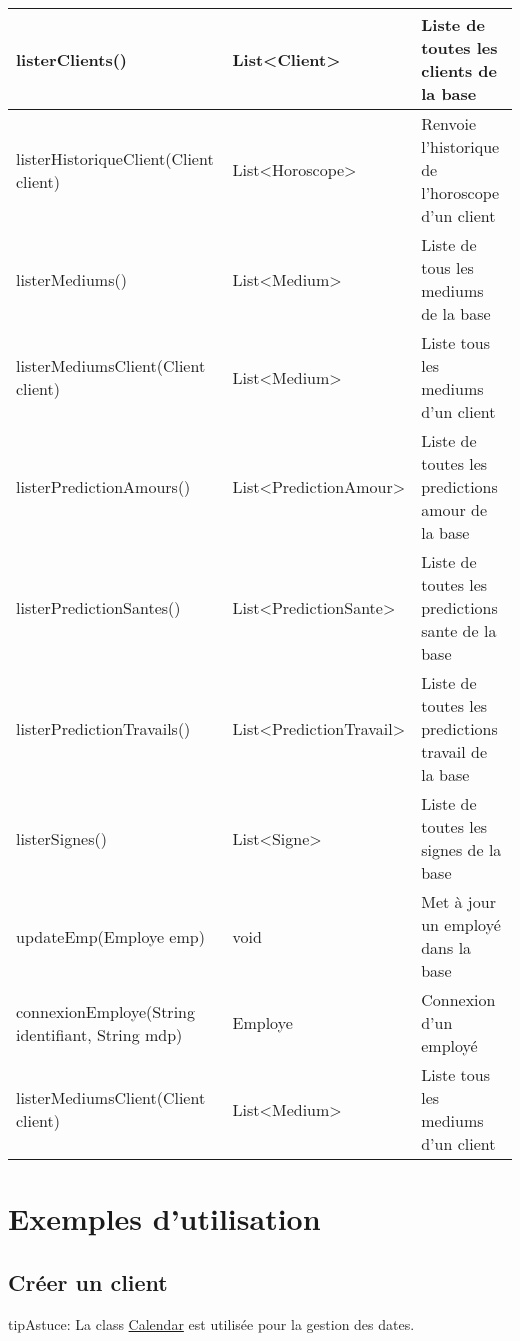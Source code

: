 \documentclass[a4paper,10pt,french]{sphinxmanual}
\begin{document}
\begin{tabulary}{\linewidth}{|p{6cm}|p{4cm}|p{5cm}|}
\hline
listerClients()
 & 
List\textless{}Client\textgreater{}
 & 
Liste de toutes les clients de la base
\\
\hline
listerHistoriqueClient(Client client)
 & 
List\textless{}Horoscope\textgreater{}
 & 
Renvoie l'historique de l'horoscope d'un client
\\
\hline
listerMediums()
 & 
List\textless{}Medium\textgreater{}
 & 
Liste de tous les mediums de la base
\\
\hline
listerMediumsClient(Client client)
 & 
List\textless{}Medium\textgreater{}
 & 
Liste tous les mediums d'un client
\\
\hline
listerPredictionAmours()
 & 
List\textless{}PredictionAmour\textgreater{}
 & 
Liste de toutes les predictions amour de la base
\\
\hline
listerPredictionSantes()
 & 
List\textless{}PredictionSante\textgreater{}
 & 
Liste de toutes les predictions sante de la base
\\
\hline
listerPredictionTravails()
 & 
List\textless{}PredictionTravail\textgreater{}
 & 
Liste de toutes les predictions travail de la base
\\
\hline
listerSignes()
 & 
List\textless{}Signe\textgreater{}
 & 
Liste de toutes les signes de la base
\\
\hline
updateEmp(Employe emp)
 & 
void
 & 
Met à jour un employé dans la base
\\
\hline
connexionEmploye(String identifiant, String mdp)
 & 
Employe
 & 
Connexion d'un employé
\\
\hline
listerMediumsClient(Client client)
 & 
List\textless{}Medium\textgreater{}
 & 
Liste tous les mediums d'un client
\\
\hline\end{tabulary}



\section{Exemples d'utilisation}
\label{services:exemples-d-utilisation}

\subsection{Créer un client}
\label{services:creer-un-client}
\begin{notice}{tip}{Astuce:}
La class \href{http://docs.oracle.com/javase/7/docs/api/java/util/Calendar.html}{Calendar} est utilisée pour la gestion des dates.
\end{notice}
\end{document}
